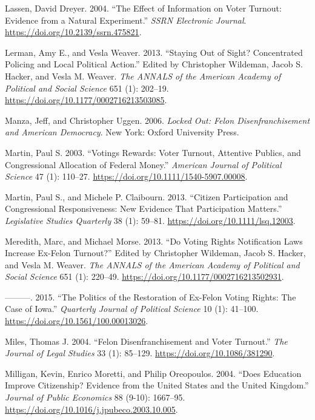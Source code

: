 \documentclass[
  12pt,
]{article}
\newlength{\cslhangindent}
\newenvironment{cslreferences}%
  {\setlength{\parindent}{0pt}%
  \everypar{\setlength{\hangindent}{\cslhangindent}}\ignorespaces}%
  {\par}
\begin{document}
\begin{cslreferences}
\leavevmode\hypertarget{ref-Lassen2004}{}%
Lassen, David Dreyer. 2004. ``The Effect of Information on Voter Turnout: Evidence from a Natural Experiment.'' \emph{SSRN Electronic Journal}. \url{https://doi.org/10.2139/ssrn.475821}.

\leavevmode\hypertarget{ref-Lerman2013}{}%
Lerman, Amy E., and Vesla Weaver. 2013. ``Staying Out of Sight? Concentrated Policing and Local Political Action.'' Edited by Christopher Wildeman, Jacob S. Hacker, and Vesla M. Weaver. \emph{The ANNALS of the American Academy of Political and Social Science} 651 (1): 202--19. \url{https://doi.org/10.1177/0002716213503085}.

\leavevmode\hypertarget{ref-locked_out}{}%
Manza, Jeff, and Christopher Uggen. 2006. \emph{Locked Out: Felon Disenfranchisement and American Democracy}. New York: Oxford University Press.

\leavevmode\hypertarget{ref-Martin2003}{}%
Martin, Paul S. 2003. ``Votings Rewards: Voter Turnout, Attentive Publics, and Congressional Allocation of Federal Money.'' \emph{American Journal of Political Science} 47 (1): 110--27. \url{https://doi.org/10.1111/1540-5907.00008}.

\leavevmode\hypertarget{ref-Martin2013}{}%
Martin, Paul S., and Michele P. Claibourn. 2013. ``Citizen Participation and Congressional Responsiveness: New Evidence That Participation Matters.'' \emph{Legislative Studies Quarterly} 38 (1): 59--81. \url{https://doi.org/10.1111/lsq.12003}.

\leavevmode\hypertarget{ref-Meredith2013}{}%
Meredith, Marc, and Michael Morse. 2013. ``Do Voting Rights Notification Laws Increase Ex-Felon Turnout?'' Edited by Christopher Wildeman, Jacob S. Hacker, and Vesla M. Weaver. \emph{The ANNALS of the American Academy of Political and Social Science} 651 (1): 220--49. \url{https://doi.org/10.1177/0002716213502931}.

\leavevmode\hypertarget{ref-Meredith2015}{}%
---------. 2015. ``The Politics of the Restoration of Ex-Felon Voting Rights: The Case of Iowa.'' \emph{Quarterly Journal of Political Science} 10 (1): 41--100. \url{https://doi.org/10.1561/100.00013026}.

\leavevmode\hypertarget{ref-Miles2004}{}%
Miles, Thomas J. 2004. ``Felon Disenfranchisement and Voter Turnout.'' \emph{The Journal of Legal Studies} 33 (1): 85--129. \url{https://doi.org/10.1086/381290}.

\leavevmode\hypertarget{ref-Milligan2004}{}%
Milligan, Kevin, Enrico Moretti, and Philip Oreopoulos. 2004. ``Does Education Improve Citizenship? Evidence from the United States and the United Kingdom.'' \emph{Journal of Public Economics} 88 (9-10): 1667--95. \url{https://doi.org/10.1016/j.jpubeco.2003.10.005}.


\end{cslreferences}
\end{document}
